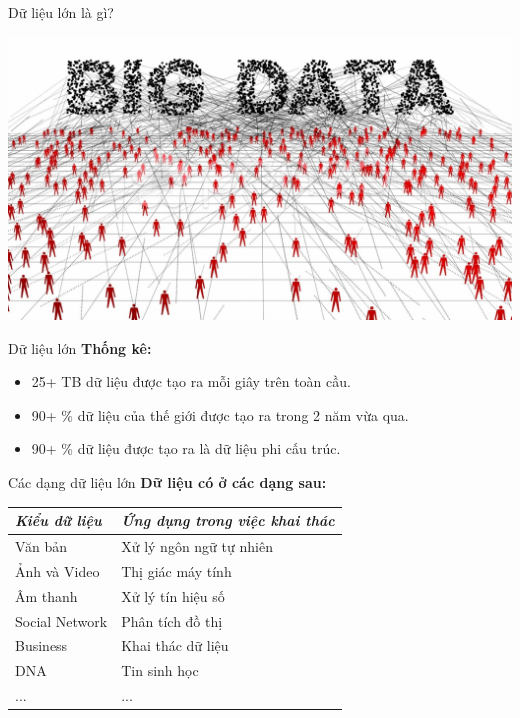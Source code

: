 \documentclass[13spt]{beamer}
\begin{document}
\begin{frame}{Dữ liệu lớn là gì?}
\transblindshorizontal
  \begin{center}
    \includegraphics[width=1\linewidth,height=0.8\textheight,keepaspectratio]{big_data_robusta.jpg}
  \end{center}
\end{frame}

\begin{frame}{Dữ liệu lớn}
\transboxin
\textbf{Thống kê:} \pause
  \begin{center}
	\begin{itemize}
		\item 25+ TB dữ liệu được tạo ra mỗi giây trên toàn cầu.  \pause 
		\item 90+ \% dữ liệu của thế giới được tạo ra trong 2 năm vừa qua. \pause
		\item 90+ \% dữ liệu được tạo ra là dữ liệu phi cấu trúc.  \linebreak  \linebreak  \linebreak  \linebreak  \linebreak  \linebreak
    \end{itemize}
  \end{center}
\end{frame}
\transblindshorizontal
\begin{frame}{Các dạng dữ liệu lớn}
	\textbf{Dữ liệu có ở các dạng sau:}
\transboxin

\begin{center}
	\begin{tabular} {l l }
    \toprule
    \it Kiểu dữ liệu & \it Ứng dụng trong việc khai thác \\
    \midrule
    Văn bản & Xử lý ngôn ngữ tự nhiên  \\
    Ảnh và Video & Thị giác máy tính  \\  
    Âm thanh & Xử lý tín hiệu số  \\
    Social Network & Phân tích đồ thị  \\  
    Business & Khai thác dữ liệu  \\
    DNA & Tin sinh học \\           
    ... & ...\\            
    \bottomrule
    \end{tabular}
\end{center}

\end{frame}
\end{document}
